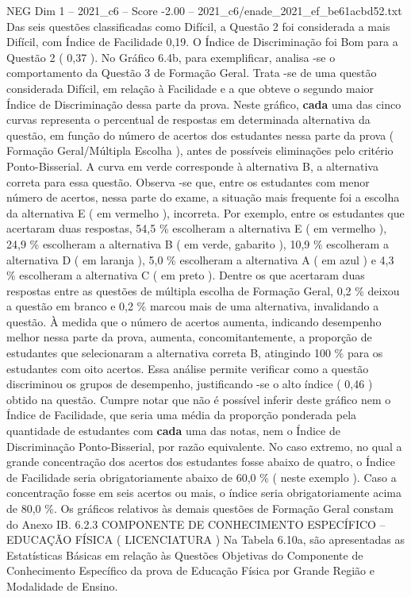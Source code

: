 \begin{textsample}{NEG Dim 1 – 2021\_c6 – Score -2.00 – 2021\_c6/enade\_2021\_ef\_be61acbd52.txt}
Das seis questões classificadas como Difícil, a Questão 2 foi considerada a mais Difícil, com Índice de Facilidade 0,19.
O Índice de Discriminação foi Bom para a Questão 2 ( 0,37 ).
No Gráfico 6.4b, para exemplificar, analisa -se o comportamento da Questão 3 de Formação Geral.
Trata -se de uma questão considerada Difícil, em relação à Facilidade e a que obteve o segundo maior Índice de Discriminação dessa parte da prova.
Neste gráfico, \textbf{cada} uma das cinco curvas representa o percentual de respostas em determinada alternativa da questão, em função do número de acertos dos estudantes nessa parte da prova ( Formação Geral/Múltipla Escolha ), antes de possíveis eliminações pelo critério Ponto-Bisserial.
A curva em verde corresponde à alternativa B, a alternativa correta para essa questão.
Observa -se que, entre os estudantes com menor número de acertos, nessa parte do exame, a situação mais frequente foi a escolha da alternativa E ( em vermelho ), incorreta.
Por exemplo, entre os estudantes que acertaram duas respostas, 54,5 \% escolheram a alternativa E ( em vermelho ), 24,9 \% escolheram a alternativa B ( em verde, gabarito ), 10,9 \% escolheram a alternativa D ( em laranja ), 5,0 \% escolheram a alternativa A ( em azul ) e 4,3 \% escolheram a alternativa C ( em preto ).
Dentre os que acertaram duas respostas entre as questões de múltipla escolha de Formação Geral, 0,2 \% deixou a questão em branco e 0,2 \% marcou mais de uma alternativa, invalidando a questão.
À medida que o número de acertos aumenta, indicando desempenho melhor nessa parte da prova, aumenta, concomitantemente, a proporção de estudantes que selecionaram a alternativa correta B, atingindo 100 \% para os estudantes com oito acertos.
Essa análise permite verificar como a questão discriminou os grupos de desempenho, justificando -se o alto índice ( 0,46 ) obtido na questão.
Cumpre notar que não é possível inferir deste gráfico nem o Índice de Facilidade, que seria uma média da proporção ponderada pela quantidade de estudantes com \textbf{cada} uma das notas, nem o Índice de Discriminação Ponto-Bisserial, por razão equivalente.
No caso extremo, no qual a grande concentração dos acertos dos estudantes fosse abaixo de quatro, o Índice de Facilidade seria obrigatoriamente abaixo de 60,0 \% ( neste exemplo ).
Caso a concentração fosse em seis acertos ou mais, o índice seria obrigatoriamente acima de 80,0 \%.
Os gráficos relativos às demais questões de Formação Geral constam do Anexo IB. 6.2.3 COMPONENTE DE CONHECIMENTO ESPECÍFICO – EDUCAÇÃO FÍSICA ( LICENCIATURA ) Na Tabela 6.10a, são apresentadas as Estatísticas Básicas em relação às Questões Objetivas do Componente de Conhecimento Específico da prova de Educação Física por Grande Região e Modalidade de Ensino.

\end{textsample}
